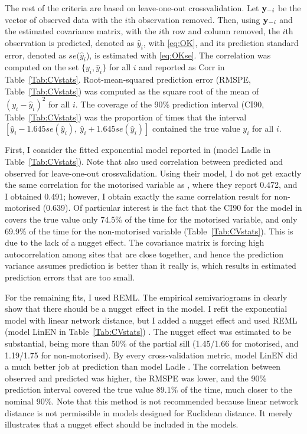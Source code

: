 \documentclass[11pt, titlepage]{article}\usepackage[]{graphicx}\usepackage[]{color}
\begin{document}
\begin{spacing}{1.9}
\begin{flushleft}
The rest of the criteria are based on leave-one-out crossvalidation.  Let $\mathbf{y}_{-i}$ be the vector of observed data with the $i$th observation removed. Then, using $\mathbf{y}_{-i}$ and the estimated covariance matrix, with the $i$th row and column removed, the $i$th observation is predicted, denoted as $\hat{y}_i$,  with \ref{eq:OK}, and its prediction standard error, denoted as $se(\hat{y}_i$), is estimated with \ref{eq:OKse}. The correlation was computed on the set $\{y_i,\hat{y}_i\}$ for all $i$ and reported as Corr in Table~\ref{Tab:CVstats}.  Root-mean-squared prediction error (RMSPE, Table~\ref{Tab:CVstats}) was computed as the square root of the mean of $(y_i-\hat{y}_i)^2$ for all $i$. The coverage of the 90\% prediction interval (CI90, Table~\ref{Tab:CVstats}) was the proportion of times that the interval $[\hat{y}_i - 1.645 se(\hat{y}_i), \ \hat{y}_i + 1.645 se(\hat{y}_i)]$ contained the true value $y_i$ for all $i$.

First, I consider the fitted exponential model reported in \citet{Ladl:Avga:Whea:Boyc:pred:2016} (model Ladle in Table~\ref{Tab:CVstats}). Note that \citet{Ladl:Avga:Whea:Boyc:pred:2016} also used correlation between predicted and observed for leave-one-out crossvalidation. Using their model, I do not get exactly the same correlation for the motorised variable as \citet{Ladl:Avga:Whea:Boyc:pred:2016}, where they report 0.472, and I obtained 0.491; however, I obtain exactly the same correlation result for non-motorised (0.639).  Of particular interest is the fact that the CI90 for the model in \citet{Ladl:Avga:Whea:Boyc:pred:2016} covers the true value only 74.5\% of the time for the motorised variable, and only 69.9\% of the time for the non-motorised variable (Table~\ref{Tab:CVstats}). This is due to the lack of a nugget effect. The covariance matrix is forcing high autocorrelation among sites that are close together, and hence the prediction variance assumes prediction is better than it really is, which results in estimated prediction errors that are too small. 

For the remaining fits, I used REML. The empirical semivariograms in \citet{Ladl:Avga:Whea:Boyc:pred:2016} clearly show that there should be a nugget effect in the model. I refit the exponential model with linear network distance, but I added a nugget effect and used REML (model LinEN in Table~\ref{Tab:CVstats}) .  The nugget effect was estimated to be substantial, being more than 50\% of the partial sill (1.45/1.66 for motorised, and 1.19/1.75 for non-motorised). By every cross-validation metric, model LinEN did a much better job at prediction than model Ladle  \citep{Ladl:Avga:Whea:Boyc:pred:2016}.  The correlation between observed and predicted was higher, the RMSPE was lower, and the 90\% prediction interval covered the true value 89.1\% of the time, much closer to the nominal 90\%. Note that this method is not recommended because linear network distance is not permissible in models designed for Euclidean distance. It merely illustrates that a nugget effect should be included in the models.


\end{flushleft}
\end{spacing}
\end{document}
